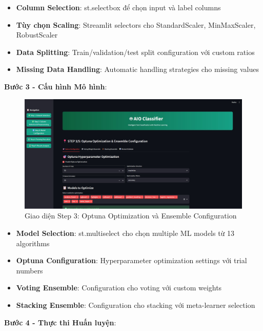 \begin{itemize}
    \item \textbf{Column Selection}: st.selectbox để chọn input và label columns
    \item \textbf{Tùy chọn Scaling}: Streamlit selectors cho StandardScaler, MinMaxScaler, RobustScaler
    \item \textbf{Data Splitting}: Train/validation/test split configuration với custom ratios
    \item \textbf{Missing Data Handling}: Automatic handling strategies cho missing values
\end{itemize}

\textbf{Bước 3 - Cấu hình Mô hình}:

\begin{figure}[H]
    \centering
\includegraphics[width=\textwidth]{UI/Step 3.jpg}
\caption{Giao diện Step 3: Optuna Optimization và Ensemble Configuration}
\label{fig:wizard_step3_real}
\end{figure}

\begin{itemize}
    \item \textbf{Model Selection}: st.multiselect cho chọn multiple ML models từ 13 algorithms
    \item \textbf{Optuna Configuration}: Hyperparameter optimization settings với trial numbers
    \item \textbf{Voting Ensemble}: Configuration cho voting với custom weights
    \item \textbf{Stacking Ensemble}: Configuration cho stacking với meta-learner selection
\end{itemize}

\textbf{Bước 4 - Thực thi Huấn luyện}:

